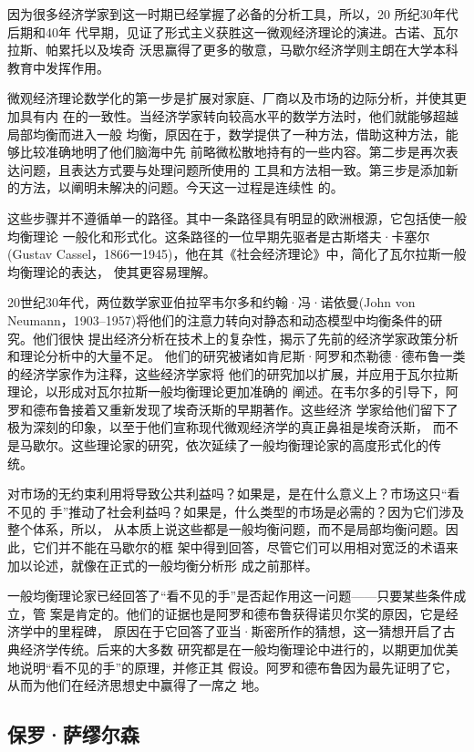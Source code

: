 因为很多经济学家到这一时期已经掌握了必备的分析工具，所以，20 所纪30年代后期和40年
代早期，见证了形式主义获胜这一微观经济理论的演进。古诺、瓦尔拉斯、帕累托以及埃奇
沃思赢得了更多的敬意，马歇尔经济学则主朗在大学本科教育中发挥作用。

微观经济理论数学化的第一步是扩展对家庭、厂商以及市场的边际分析，并使其更加具有内
在的一致性。当经济学家转向较高水平的数学方法时，他们就能够超越局部均衡而进入一般
均衡，原因在于，数学提供了一种方法，借助这种方法，能够比较准确地明了他们脑海中先
前略微松散地持有的一些内容。第二步是再次表达问题，且表达方式要与处理问题所使用的
工具和方法相一致。第三步是添加新的方法，以阐明未解决的问题。今天这一过程是连续性
的。

这些步骤并不遵循单一的路径。其中一条路径具有明显的欧洲根源，它包括使一般均衡理论
一般化和形式化。这条路径的一位早期先驱者是古斯塔夫·卡塞尔(Gustav
Cassel，1866一1945)，他在其《社会经济理论》中，简化了瓦尔拉斯一般均衡理论的表达，
使其更容易理解。

20世纪30年代，两位数学家亚伯拉罕韦尔多和约翰·冯·诺依曼(John von
Neumann，1903--1957)将他们的注意力转向对静态和动态模型中均衡条件的研究。他们很快
提出经济分析在技术上的复杂性，揭示了先前的经济学家政策分析和理论分析中的大量不足。
他们的研究被诸如肯尼斯·阿罗和杰勒德·德布鲁一类的经济学家作为注释，这些经济学家将
他们的研究加以扩展，并应用于瓦尔拉斯理论，以形成对瓦尔拉斯一般均衡理论更加准确的
阐述。在韦尔多的引导下，阿罗和德布鲁接着又重新发现了埃奇沃斯的早期著作。这些经济
学家给他们留下了极为深刻的印象，以至于他们宣称现代微观经济学的真正鼻祖是埃奇沃斯，
而不是马歇尔。这些理论家的研究，依次延续了一般均衡理论家的高度形式化的传
统。

对市场的无约束利用将导致公共利益吗？如果是，是在什么意义上？市场这只“看不见的
手”推动了社会利益吗？如果是，什么类型的市场是必需的？因为它们涉及整个体系，所以，
从本质上说这些都是一般均衡问题，而不是局部均衡问题。因此，它们并不能在马歇尔的框
架中得到回答，尽管它们可以用相对宽泛的术语来加以论述，就像在正式的一般均衡分析形
成之前那样。

一般均衡理论家已经回答了“看不见的手”是否起作用这一问题——只要某些条件成立，管
案是肯定的。他们的证据也是阿罗和德布鲁获得诺贝尔奖的原因，它是经济学中的里程碑，
原因在于它回答了亚当·斯密所作的猜想，这一猜想开启了古典经济学传统。后来的大多数
研究都是在一般均衡理论中进行的，以期更加优美地说明“看不见的手”的原理，并修正其
假设。阿罗和德布鲁因为最先证明了它，从而为他们在经济思想史中赢得了一席之
地。

\subsection{保罗·萨缪尔森}

